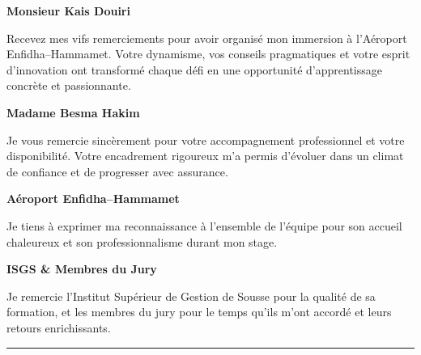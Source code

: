 \documentclass[a4paper,11pt]{report}
\begin{document}
\vspace{0.5cm}

\begin{center}
    \textbf{\Large Monsieur Kais Douiri}
\end{center}

\vspace{0.3cm}

\noindent
Recevez mes vifs remerciements pour avoir organisé mon immersion à l’Aéroport Enfidha–Hammamet. Votre dynamisme, vos conseils pragmatiques et votre esprit d’innovation ont transformé chaque défi en une opportunité d’apprentissage concrète et passionnante.

\vspace{0.5cm}

\begin{center}
    \textbf{\Large Madame Besma Hakim}
\end{center}

\vspace{0.3cm}

\noindent
Je vous remercie sincèrement pour votre accompagnement professionnel et votre disponibilité. Votre encadrement rigoureux m’a permis d’évoluer dans un climat de confiance et de progresser avec assurance.

\vspace{0.5cm}

\begin{center}
    \textbf{\Large Aéroport Enfidha–Hammamet}
\end{center}

\vspace{0.3cm}

\noindent
Je tiens à exprimer ma reconnaissance à l’ensemble de l’équipe pour son accueil chaleureux et son professionnalisme durant mon stage.

\vspace{0.5cm}

\begin{center}
    \textbf{\Large ISGS \& Membres du Jury}
\end{center}

\vspace{0.3cm}

\noindent
Je remercie l’Institut Supérieur de Gestion de Sousse pour la qualité de sa formation, et les membres du jury pour le temps qu’ils m’ont accordé et leurs retours enrichissants.

\vspace{0.5cm}
\noindent\rule{\linewidth}{0.4pt}
\end{document}

